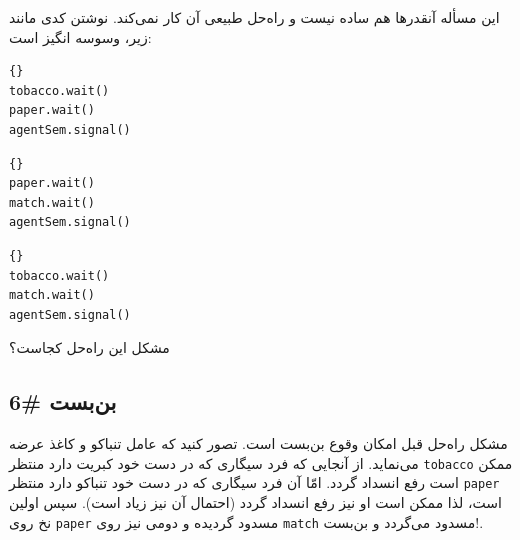 \documentclass{book}
\newcommand{\clearemptydoublepage}{\newpage\cleardoublepage}
\begin{document}
    این مسأله آنقدرها هم ساده نیست و راه‌حل طبیعی آن کار نمی‌کند. نوشتن کدی مانند زیر، وسوسه انگیز است: 
    

\begin{latin}
\begin{lstlisting}[title=\rl{سیگاری با کبریت}]{}
tobacco.wait()
paper.wait()
agentSem.signal()
\end{lstlisting}
\end{latin}

\begin{latin}
\begin{lstlisting}[title=\rl{سیگاری با تنباکو}]{}
paper.wait()
match.wait()
agentSem.signal()
\end{lstlisting}
\end{latin}

\begin{latin}
\begin{lstlisting}[title=\rl{سیگاری با کاغذ}]{}
tobacco.wait()
match.wait()
agentSem.signal()
\end{lstlisting}
\end{latin}

    مشکل این  راه‌حل کجاست؟

\clearemptydoublepage
\subsection{بن‌بست \#6}

    مشکل راه‌حل قبل امکان وقوع بن‌بست است. تصور کنید که عامل تنباکو و کاغذ عرضه می‌نماید. از آنجایی که فرد  سیگاری‌ که در دست خود کبریت دارد 
    منتظر {\tt tobacco} ممکن است رفع انسداد گردد. امّا آن فرد سیگاری که در دست خود تنباکو دارد منتظر {\tt paper} است، لذا ممکن است او نیز 
    رفع انسداد گردد (احتمال آن نیز زیاد است). سپس اولین نخ روی {\tt paper} مسدود گردیده و دومی نیز روی {\tt match} مسدود می‌گردد و بن‌بست!. 
\end{document}
